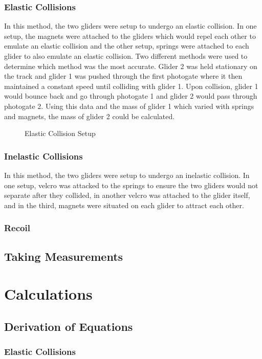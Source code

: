 \documentclass[12pt]{article}
\begin{document}
\subsubsection{Elastic Collisions}
In this method, the two gliders were setup to undergo an elastic collision. In one setup, the magnets were attached to the gliders which would repel each other to emulate an elastic collision and the other setup, springs were attached to each glider to also emulate an elastic collision. Two different methods were used to determine which method was the most accurate. Glider 2 was held stationary on the track and glider 1 was pushed through the first photogate where it then maintained a constant speed until colliding with glider 1. Upon collision, glider 1 would bounce back and go through photogate 1 and glider 2 would pass through photogate 2. Using this data and the mass of glider 1 which varied with springs and magnets, the mass of glider 2 could be calculated.
\begin{figure}[H]
    \centering
    
    \caption{Elastic Collision Setup}
\end{figure}
\subsubsection{Inelastic Collisions}
In this method, the two gliders were setup to undergo an inelastic collision. In one setup, velcro was attacked to the springs to ensure the two gliders would not separate after they collided, in another velcro was attached to the glider itself, and in the third, magnets were situated on each glider to attract each other.
\subsubsection{Recoil}
\subsection{Taking Measurements}

\newpage
\section{Calculations}
\subsection{Derivation of Equations}
\subsubsection{Elastic Collisions}
\end{document}
